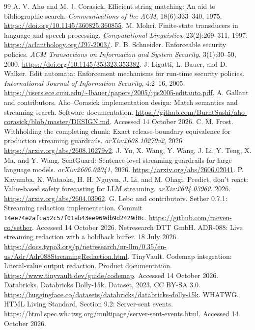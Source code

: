\documentclass[11pt,a4paper]{article}
\begin{document}
\begin{thebibliography}{99}\small
{} A. V. Aho and M. J. Corasick. Efficient string matching: An aid to bibliographic search. \emph{Communications of the ACM}, 18(6):333--340, 1975. \url{https://doi.org/10.1145/360825.360855}.
 M. Mohri. Finite-state transducers in language and speech processing. \emph{Computational Linguistics}, 23(2):269--311, 1997. \url{https://aclanthology.org/J97-2003/}.
 F. B. Schneider. Enforceable security policies. \emph{ACM Transactions on Information and System Security}, 3(1):30--50, 2000. \url{https://doi.org/10.1145/353323.353382}.
 J. Ligatti, L. Bauer, and D. Walker. Edit automata: Enforcement mechanisms for run-time security policies. \emph{International Journal of Information Security}, 4:2--16, 2005. \url{https://users.ece.cmu.edu/~lbauer/papers/2005/ijis2005-editauto.pdf}.
 A. Gallant and contributors. Aho--Corasick implementation design: Match semantics and streaming search. Software documentation. \url{https://github.com/BurntSushi/aho-corasick/blob/master/DESIGN.md}. Accessed 14 October 2026.
 C. M. Frost. Withholding the completing chunk: Exact release-boundary equivalence for production streaming guardrails. \emph{arXiv:2608.10279v2}, 2026. \url{https://arxiv.org/abs/2608.10279v2}.
 J. Yu, X. Wang, Y. Wang, J. Li, Y. Teng, X. Ma, and Y. Wang. SentGuard: Sentence-level streaming guardrails for large language models. \emph{arXiv:2606.02041}, 2026. \url{https://arxiv.org/abs/2606.02041}.
 P. Kavumba, K. Wataoka, H. H. Nguyen, J. Li, and M. Ohagi. Predict, don't react: Value-based safety forecasting for LLM streaming. \emph{arXiv:2604.03962}, 2026. \url{https://arxiv.org/abs/2604.03962}.
 G. Lebo and contributors. Sether 0.7.1: Streaming redaction implementation. Commit \texttt{14ee74e2afca52c57f01ab43ee969db9d2429d0c}. \url{https://github.com/raeven-co/sether}. Accessed 14 October 2026.
 Netresearch DTT GmbH. ADR-088: Live streaming redaction with a holdback buffer. 18 July 2026. \url{https://docs.typo3.org/p/netresearch/nr-llm/0.35/en-us/Adr/Adr088StreamingRedaction.html}.
 TinyVault. Codemap integration: Literal-value output redaction. Product documentation. \url{https://www.tinyvault.dev/guide/codemap}. Accessed 14 October 2026.
 Databricks. Databricks Dolly-15k. Dataset, 2023. CC BY-SA 3.0. \url{https://huggingface.co/datasets/databricks/databricks-dolly-15k}.
 WHATWG. HTML Living Standard, Section 9.2: Server-sent events. \url{https://html.spec.whatwg.org/multipage/server-sent-events.html}. Accessed 14 October 2026.
\end{thebibliography}
\end{document}
